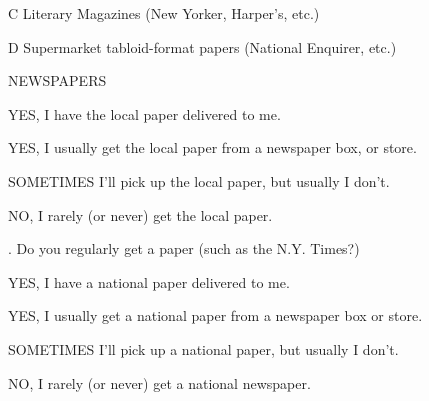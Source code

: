\medskip\par\noindent
{\fiverm C}
\hbox{\vrule height 0.4pt width 0.5in} Literary Magazines (New 
Yorker, Harper's, etc.)
\medskip\par\noindent
{\fiverm D}
\hbox{\vrule height 0.4pt width 0.5in} Supermarket tabloid-format 
papers (National Enquirer, etc.)
\bigskip\bigskip\par\noindent
\centerline{\twlbf NEWSPAPERS}
\bigskip\bigskip\par\noindent
{}
\medskip\par\noindent
{}
\hbox{\vrule height 0.4pt width 0.5in} YES, I have the local paper delivered
to me.
\medskip\par\noindent
{}
\hbox{\vrule height 0.4pt width 0.5in} YES, I usually get the local paper from
a newspaper box, or store.
\medskip\par\noindent
{}
\hbox{\vrule height 0.4pt width 0.5in} SOMETIMES I'll pick up the local 
paper, but usually I don't.
\medskip\par\noindent
{}
\hbox{\vrule height 0.4pt width 0.5in} NO, I rarely (or never) get the local
paper.
\bigskip\bigskip\par\noindent
{. Do you regularly get a  paper (such as
the N.Y. Times?)}
\medskip\par\noindent
{}
\hbox{\vrule height 0.4pt width 0.5in} YES, I have a national paper 
delivered to me.
\medskip\par\noindent
{}
\hbox{\vrule height 0.4pt width 0.5in} YES, I usually get a national
paper from a newspaper box or store.
\medskip\par\noindent
{}
\hbox{\vrule height 0.4pt width 0.5in} SOMETIMES I'll pick up a national
paper, but usually I don't.
\medskip\par\noindent
{}
\hbox{\vrule height 0.4pt width 0.5in} NO, I rarely (or never) get a national
newspaper.
\vfill\eject
